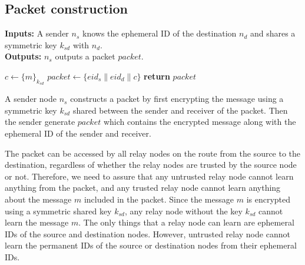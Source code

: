 \documentclass[11pt]{article}
\begin{document}
\subsection{Packet construction}
\begin{framed}
\noindent
\textbf{Inputs:} A sender $n_s$ knows the ephemeral ID of the destination $n_d$ and shares a symmetric key $k_{sd}$ with $n_d$. \\

\noindent
\textbf{Outputs:} $n_s$ outputs a packet $packet$. \\

\begin{algorithmic}[1]
    \State $c \leftarrow \{m\}_{k_{sd}}$
    \State $packet \leftarrow \{eid_s \| eid_d \| c\}$
    \State \textbf{return} $packet$
  \EndProcedure
\end{algorithmic}
\end{framed}

A sender node $n_s$ constructs a packet by first encrypting the message using a symmetric key $k_{sd}$ shared between the sender and receiver of the packet.  
Then the sender generate $packet$ which contains the encrypted message along with the ephemeral ID of the sender and receiver. 

The packet can be accessed by all relay nodes on the route from the source to the destination, regardless of whether the relay nodes are trusted by the source node or not.
Therefore, we need to assure that any untrusted relay node cannot learn anything from the packet, and any trusted relay node cannot learn anything about the message $m$ included in the packet.
Since the message $m$ is encrypted using a symmetric shared key $k_{sd}$, any relay node without the key $k_{sd}$ cannot learn the message $m$.
The only things that a relay node can learn are ephemeral IDs of the source and destination nodes. 
However, untrusted relay node cannot learn the permanent IDs of the source or destination nodes from their ephemeral IDs. 
\end{document}
